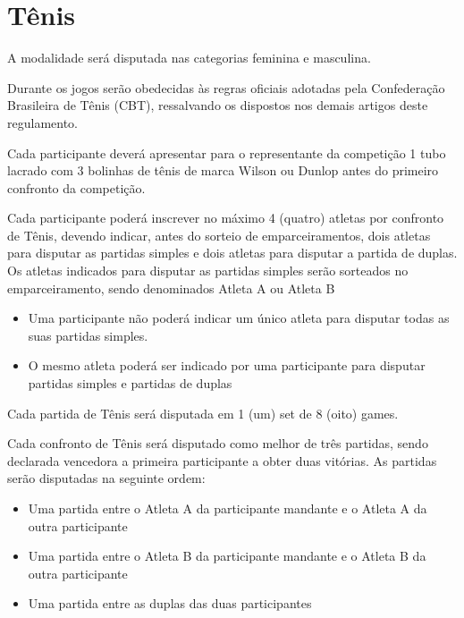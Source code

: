 {\let\clearpage\relax \chapter{Tênis}}

\begin{article}
	A modalidade será disputada nas categorias feminina e masculina.
\end{article}

\begin{article}
	Durante os jogos serão obedecidas às regras oficiais adotadas pela Confederação Brasileira de Tênis (CBT), ressalvando os dispostos nos demais artigos deste regulamento.
\end{article}

\begin{article}
	Cada participante deverá apresentar para o representante da competição 1 tubo lacrado com 3 bolinhas de tênis de marca Wilson ou Dunlop antes do primeiro confronto da competição.
\end{article}

\begin{article}
	Cada participante poderá inscrever no máximo 4 (quatro) atletas por confronto de Tênis, devendo indicar, antes do sorteio de emparceiramentos, dois atletas para disputar as partidas simples e dois atletas para disputar a partida de duplas. Os atletas indicados para disputar as partidas simples serão sorteados no emparceiramento, sendo denominados Atleta A ou Atleta B

	\begin{itemize}[noitemsep]
		\item Uma participante não poderá indicar um único atleta para disputar todas as suas partidas simples.
		\item O mesmo atleta poderá ser indicado por uma participante para disputar partidas simples e partidas de duplas
	\end{itemize}

	Cada partida de Tênis será disputada em 1 (um) set de 8 (oito) games.
\end{article}

\noindent
Cada confronto de Tênis será disputado como melhor de três partidas, sendo declarada vencedora a primeira participante a obter duas vitórias. As partidas serão disputadas na seguinte ordem:
\begin{itemize}[noitemsep]
	\item Uma partida entre o Atleta A da participante mandante e o Atleta A da outra participante
	\item Uma partida entre o Atleta B da participante mandante e o Atleta B da outra participante
	\item Uma partida entre as duplas das duas participantes
\end{itemize}


